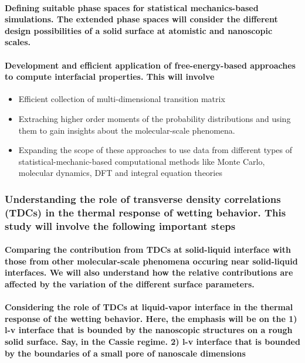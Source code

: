 \documentclass[a4paper,12pt,single,pdftex]{scrartcl}
\begin{document}
\label{ID_957715212}\paragraph{Defining suitable phase spaces for statistical mechanics-based simulations. The extended phase spaces will consider the different design possibilities of a solid surface at atomistic and nanoscopic scales.}

\label{ID_534544736}\paragraph{Development and efficient application of free-energy-based approaches to compute interfacial properties. This will involve}

\begin{itemize}
\label{ID_1978254381}\item Efficient collection of multi-dimensional transition matrix
\label{ID_1273631572}\item Extraching higher order moments of the probability distributions and using them to gain insights about the molecular-scale phenomena.
\label{ID_916433473}\item Expanding the scope of these approaches to use data from different types of statistical-mechanic-based computational methods like Monte Carlo, molecular dynamics, DFT and integral equation theories
\end{itemize}
\label{ID_1978254381}\label{ID_1273631572}\label{ID_916433473}\label{ID_1343604658}\subsubsection{Understanding the role of transverse density correlations (TDCs) in the thermal response of wetting behavior. This study will involve the following important steps}

\label{ID_1458428234}\paragraph{Comparing the contribution from TDCs at solid-liquid interface with those from other molecular-scale phenomena occuring near solid-liquid interfaces. We will also understand how the relative contributions are affected by the variation of the different surface parameters.}

\label{ID_1578421438}\paragraph{Considering the role of TDCs at liquid-vapor interface in the thermal response of the wetting behavior. Here, the emphasis will be on the 1) l-v interface that is bounded by the nanoscopic structures on a rough solid surface. Say, in the Cassie regime. 2) l-v interface that is bounded by the boundaries of a small pore of nanoscale dimensions}
\end{document}
